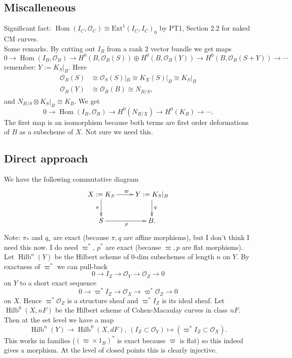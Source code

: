 \documentclass{amsart}
\theoremstyle{definition}
\renewcommand{\O}{\mathcal{O}}
\newcommand{\Hom}{\operatorname{Hom}}
\newcommand{\Hilb}{\operatorname{Hilb}}
\begin{document}
\subsection{Miscalleneous} Significant fact: $\Hom(I_C,\O_C) \cong \mathrm{Ext}^1(I_C,I_C)_0$ by PT1, Section 2.2 for naked CM curves. \\

Some remarks. By cutting out $I_B$ from a rank 2 vector bundle we get maps
\[
0 \rightarrow \Hom(I_B, \O_B) \rightarrow H^0(B,\O_B(S)) \oplus H^0(B,\O_B(Y)) \rightarrow H^0(B,\O_B(S+Y)) \rightarrow \cdots
\]
remember: $Y := K_S|_B$. Here 
\begin{align*}
\O_B(S) &\cong \O_S(S) |_{B} \cong K_X (S) |_B \cong K_S |_B \\
\O_B(Y) &\cong \O_B(B) \cong N_{B/S},
\end{align*}
and $N_{B/S} \otimes K_S|_B \cong K_B$. We get
 \[
0 \rightarrow \Hom(I_B, \O_B) \rightarrow H^0(N_{B/X}) \rightarrow H^0(K_B) \rightarrow \cdots.
\]
The first map is an isomorphism because both terms are first order deformations of $B$ as a subscheme of $X$. Not sure we need this.

\subsection{Direct approach}

We have the following commutative diagram
\begin{displaymath}
\xymatrix
{
X:=K_S \ar^{\varpi}[r] \ar_{\pi}[d] & Y:=K_S|_B \ar^{q}[d] \\
S \ar_{p}[r] & B.
}
\end{displaymath}
Note: $\pi_*$ and $q_*$ are exact (because $\pi, q$ are affine morphisms), but I don't think I need this now. I do need $\varpi^*$, $p^*$ are exact (because $\varpi, p$ are flat morphisms). Let $\Hilb^n(Y)$ be the Hilbert scheme of 0-dim subschemes of length $n$ on $Y$. By exactness of $\varpi^*$ we can pull-back
$$
0 \rightarrow I_Z \rightarrow \O_Y \rightarrow \O_Z \rightarrow 0
$$
on $Y$ to a short exact sequence
$$
0 \rightarrow \varpi^* I_Z \rightarrow \O_X \rightarrow \varpi^* \O_Z \rightarrow 0
$$
on $X$. Hence $\varpi^* \O_Z$ is a structure sheaf and $\varpi^* I_Z$ is its ideal sheaf. Let $\Hilb^0(X, nF)$ be the Hilbert scheme of Cohen-Macaulay curves in class $nF$. Then at the set level we have a map
$$
\Hilb^n(Y) \rightarrow \Hilb^0(X,dF), \ (I_Z \subset \O_Y) \mapsto (\varpi^* I_Z \subset \O_X).
$$
This works in families ($(\varpi \times 1_B)^*$ is exact because $\varpi$ is flat) so this indeed gives a morphism. At the level of closed points this is clearly injective.
\end{document}
